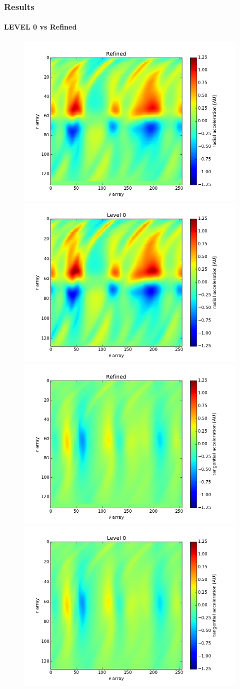 \documentclass{beamer}
\begin{document}
\begin{frame}
\frametitle{Results}
\framesubtitle{LEVEL 0 vs Refined}
\begin{figure}
\includegraphics[width = .5\textwidth]{./ref_radial.png}
\includegraphics[width = .5\textwidth]{./level0_radial.png}
\newline
\includegraphics[width = .5\textwidth]{./ref_tangential.png}
\includegraphics[width = .5\textwidth]{./level0_tangential.png}
\end{figure}

 
\end{frame}
\end{document}
